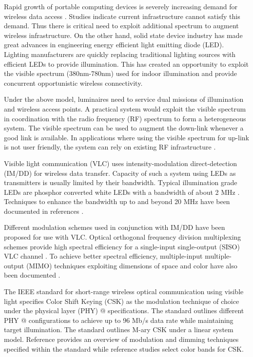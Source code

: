 \documentclass[10pt,letterpaper]{article}
\makeatletter
\newcommand*{\rmnum}[1]{\expandafter\@slowromancap\romannumeral #1@}
\makeatother
\begin{document}
Rapid growth of portable computing devices is severely increasing demand for wireless data access \cite{cis14a}. Studies indicate current infrastructure cannot satisfy this demand. Thus there is critical need to exploit additional spectrum to augment wireless infrastructure. On the other hand, solid state device industry has made great advances in engineering energy efficient light emitting diode (LED). Lighting manufacturers are quickly replacing traditional lighting sources with efficient LEDs to provide illumination. This has created an opportunity to exploit the visible spectrum (380nm-780nm) used for indoor illumination and provide concurrent opportunistic wireless connectivity. 

Under the above model, luminaires need to service dual missions of illumination and wireless access points. A practical system would exploit the visible spectrum in coordination with the radio frequency (RF) spectrum to form a heterogeneous system. The visible spectrum can be used to augment the down-link whenever a good link is available. In applications where using the visible spectrum for up-link is not user friendly, the system can rely on existing RF infrastructure \cite{rah15a}.

Visible light communication (VLC) uses intensity-modulation direct-detection (IM/DD) for wireless data transfer. Capacity of such a system using LEDs as transmitters is usually limited by their bandwidth. Typical illumination grade LEDs are phosphor converted white LEDs with a bandwidth of about 2 MHz \cite{gru08b}. Techniques to enhance the bandwidth up to and beyond 20 MHz have been documented in references \cite{gru08b,min08a}. 

Different modulation schemes used in conjunction with IM/DD have been proposed for use with VLC. Optical orthogonal frequency division multiplexing schemes provide high spectral efficiency for a single-input single-output (SISO) VLC channel \cite{arm09a}. To achieve better spectral efficiency, multiple-input multiple-output (MIMO) techniques exploiting dimensions of space and color have also been documented \cite{but14b,cskxy,but12a}.

The IEEE standard for short-range wireless optical communication using visible light \cite{ieee802.15.7} specifies Color Shift Keying (CSK) as the modulation technique of choice under the physical layer (PHY) \rmnum{3} specifications. The standard outlines different PHY \rmnum{3} configurations to achieve up to 96 Mb/s data rate while maintaining target illumination. The standard outlines M-ary CSK under a linear system model. Reference \cite{raj12a} provides an overview of modulation and dimming techniques specified within the standard while reference \cite{sin13a} studies select color bands for CSK.
\end{document}

